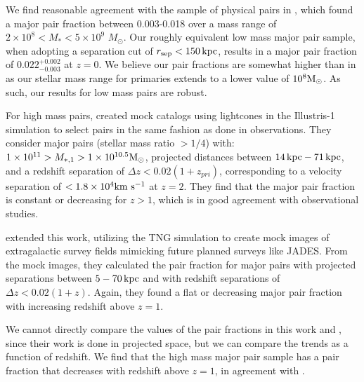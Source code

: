 \documentclass[twocolumn]{aastex631}
\begin{document}
        We find reasonable agreement with the sample of physical pairs in \cite{Besla2018}, which found a major pair fraction between 0.003-0.018 over a mass range of $2\times 10^8 < M_* < 5 \times 10^9$ $M_\odot$.
        Our roughly equivalent low mass major pair sample, when adopting a separation cut of $r_{\mathrm{sep}}<150\mathrm{\,kpc}$, results in a major pair fraction of $0.022^{+0.002}_{-0.003}$ at $z=0$. We believe our pair fractions are somewhat higher than in \cite{Besla2018} as our stellar mass range for primaries extends to a lower value of $10^8\mathrm{M}_\odot$. As such,  our results for low mass pairs are robust.  

        For high mass pairs, \citet{Snyder2017} created mock catalogs using lightcones in the Illustris-1 simulation to select pairs in the same fashion as done in observations. 
        They consider major pairs (stellar mass ratio $>1/4$) with: $1\times 10^{11}>M_{*,1} >1\times 10^{10.5}\mathrm{M}_\odot$, projected distances between $14\mathrm{\,kpc}-71\mathrm{\,kpc}$, and a redshift separation of $\Delta z<0.02(1+z_{pri})$, corresponding to a velocity separation of $<1.8\times10^4\mathrm{km}~\mathrm{s}^{-1}$ at $z=2$. 
        They find that the major pair fraction is constant or decreasing for $z>1$, which is in good agreement with observational studies.
        
        \citet{Snyder2023} extended this work, utilizing the TNG simulation to create mock images of extragalactic survey fields mimicking future planned surveys like JADES.
        From the mock images, they calculated the pair fraction for major pairs with projected separations between $5-70 \mathrm{\,kpc}$ and with redshift separations of $\Delta z< 0.02(1+z)$. 
        Again, they found a flat or decreasing major pair fraction with increasing redshift above $z=1$. 
        
        We cannot directly compare the values of the pair fractions in this work and \citet{Snyder2023}, since their work is done in projected space, but we can compare the trends as a function of redshift. 
        We find that the high mass major pair sample has a pair fraction that decreases with redshift above $z=1$, in agreement with \cite{Snyder2023}.
\end{document}
